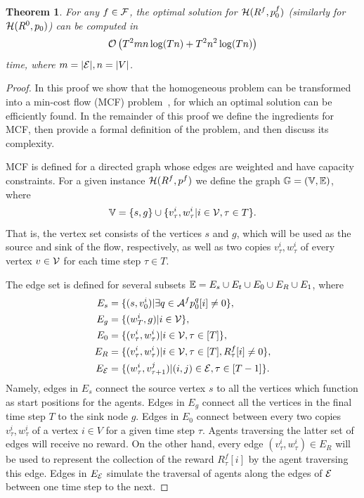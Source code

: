 \documentclass[conference]{IEEEtran}
\newtheorem{theorem}{Theorem}[section]
\begin{document}
\begin{theorem}\label{thm:homogeneous}
  For any $f\in \mathcal{F}$, the optimal solution for $\mathcal{H}(R^f, p^f_0)$ (similarly for $\mathcal{H}(R^0,p_0)$) can be computed in 
  $$\mathcal{O}\left(T^2mn\log (Tn)+T^2n^2\log (Tn)\right)$$
  time, where $m=|\mathcal{E}|,n=|V|$. 
\end{theorem}
\begin{proof}
  In this proof we show that the homogeneous problem can be transformed into a min-cost flow (MCF) problem~\cite{Williamson2019}, for which an optimal solution can be efficiently found. In the remainder of this proof we define the ingredients for MCF, then provide a formal definition of the problem, and then discuss its complexity.

MCF is defined for a directed graph whose edges are weighted and have capacity constraints. For a given instance $\mathcal{H}(R^f,p^f)$ we define the graph $\mathbb{G}=(\mathbb{V},\mathbb{E})$, where
$$\mathbb{V}=\{s,g\}\cup\{v^i_\tau,w^i_\tau|i\in \mathcal{V},\tau\in T\}.$$
That is, the vertex set consists of the vertices $s$ and $g$, which will be used as the source and sink of the flow, respectively, as well as two copies $v^i_\tau,w^i_\tau$ of every vertex $v\in \mathcal{V}$ for each time step $\tau\in T$. 

The edge set is defined for several subsets $\mathbb{E}=E_{s}\cup E_t\cup E_0\cup E_{R}\cup E_1$, where
\begin{align*}
  E_s&=\{(s,v^i_0)|\exists q\in \mathcal{A}^f p^q_0[i]\neq 0\},\\
  E_g&=\{(w^i_T,g)|i\in \mathcal{V}\},\\
  E_0&=\{(v^i_\tau,w^i_\tau)|i\in \mathcal{V}, \tau\in [T]\},\\
  E_{R}&=\{(v^i_\tau,w^i_\tau)|i\in \mathcal{V}, \tau\in [T],R^f_\tau[i]\neq 0\},\\
  E_{\mathcal{E}}&=\{(w^i_\tau,v^j_{\tau+1})|(i,j)\in \mathcal{E}, \tau\in [T-1]\}.  
\end{align*}
Namely, edges in $E_s$ connect the source vertex $s$ to all the vertices which function as start positions for the agents. Edges in $E_g$ connect all the vertices in the final time step $T$ to the sink node $g$. Edges in $E_0$ connect between every two copies $v^i_\tau,w^i_\tau$ of a vertex $i\in V$ for a given time step $\tau$. Agents traversing the latter set of edges will receive no reward. On the other hand, every edge $(v^i_\tau,w^i_\tau)\in E_R$ will be used to represent the collection of the reward $R^f_\tau[i]$ by the agent traversing this edge. Edges in $E_{\mathcal{E}}$ simulate the traversal of agents along the edges of $\mathcal{E}$ between one time step to the next. 


\end{proof}
\end{document}
